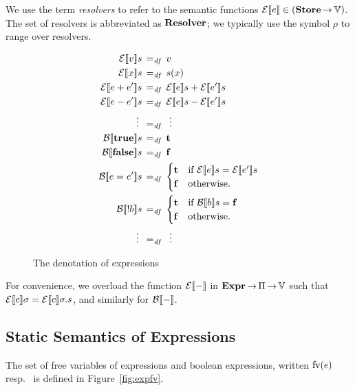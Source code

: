 \documentclass[11pt]{report}
\begin{document}
We use the term \emph{resolvers} to refer to the semantic functions $\mathcal{E}[\![e]\!] \in (\mathbf{Store} \operatorname{\rightarrow} \mathbb{V})$. The set of resolvers is abbreviated as $\mathbf{Resolver}$; we typically use the symbol $\rho$ to range over resolvers. 

\begin{figure}[h]
	\centering
		\begin{align*}
			\dnexpr{v}s & \eqdef v \\
			\dnexpr{x}s & \eqdef s(x) \\
			\dnexpr{e + e'}s & \eqdef \dnexpr{e}s + \dnexpr{e'}s \\
			\dnexpr{e - e'}s & \eqdef \dnexpr{e}s - \dnexpr{e'}s \\
			\vdots~ & \eqdef ~\vdots \\
			\dnbexpr{\bexpt}s & \eqdef \bvt \\
			\dnbexpr{\bexpf}s & \eqdef \bvf \\
			\dnbexpr{e = e'}s & \eqdef \begin{cases}
				\bvt & \text{if $\dnexpr{e}s = \dnexpr{e'}s$} \\
				\bvf & \text{otherwise.}
			\end{cases}\\
			\dnbexpr{!b}s & \eqdef \begin{cases}
				\bvt & \text{if $\dnbexpr{b}s = \bvf$} \\
				\bvf & \text{otherwise.}
			\end{cases}\\
			\vdots~ & \eqdef ~\vdots
		\end{align*}
	\caption{The denotation of expressions}
	\label{fig:dnexpr}
\end{figure}

For convenience, we overload the function $\mathcal{E}[\![-]\!]$ in $\mathbf{Expr} \operatorname{\rightarrow} \Pi \operatorname{\rightarrow} \mathbb{V}$ such that $\mathcal{E}[\![c]\!]\sigma = \mathcal{E}[\![c]\!]\sigma.s$, and similarly for $\mathcal{B}[\![-]\!]$. 


\subsection{Static Semantics of Expressions} %
\label{sub:static_semantics_of_expressions}

The set of free variables of expressions and boolean expressions, written $\mathrm{fv}(e)$ resp.~ is defined in Figure~\ref{fig:expfv}. 
\end{document}

